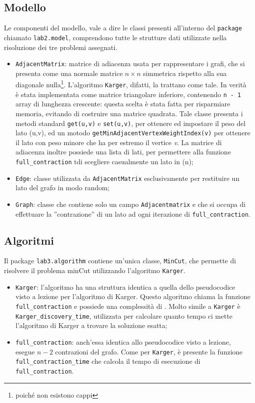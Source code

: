 \subsection{Modello}
Le componenti del modello, vale a dire le classi presenti all'interno del \texttt{package} chiamato \texttt{lab2.model}, comprendono tutte le strutture dati utilizzate nella risoluzione dei tre problemi assegnati. 
\begin{itemize}
	\item \label{adjmat}\texttt{AdjacentMatrix}: matrice di adiacenza usata per rappresentare i grafi, che si presenta come una normale matrice $n\times n$ simmetrica rispetto alla sua diagonale nulla\footnote{poiché non esistono cappi}. L'algoritmo \texttt{Karger}, difatti, la trattano come tale. In verità è stata implementata come matrice triangolare inferiore, contenendo \texttt{n - 1} array di lunghezza crescente: questa scelta è stata fatta per risparmiare memoria, evitando di costruire una matrice quadrata. Tale classe presenta i metodi standard \texttt{get(u,v)} e \texttt{set(u,v)}, per ottenere ed impostare il peso del lato (u,v), ed un motodo \texttt{getMinAdjacentVertexWeightIndex(v)} per ottenere il lato con peso minore che ha per estremo il vertice \textit{v}. La matrice di adiacenza inoltre possiede una lista di lati, per permettere alla funzione \texttt{full\_contraction} tdi scegliere casualmente un lato in \comp(n);
	\item \texttt{Edge}: classe utilizzata da \texttt{AdjacentMatrix} esclusivamente per restituire un lato del grafo in modo random;
	\item \texttt{Graph}: classe che contiene solo un campo \texttt{Adjacentmatrix} e che si occupa di effettuare la ''contrazione'' di un lato ad ogni iterazione di \texttt{full\_contraction}.
\end{itemize} 

\subsection{Algoritmi}
Il package \texttt{lab3.algorithm} contiene un'unica classe, \texttt{MinCut}, che permette di risolvere il problema minCut utilizzando l'algoritmo \texttt{Karger}.
\begin{itemize}
	\item \texttt{Karger}: l'algoritmo ha una struttura identica a quella dello pseudocodice visto a lezione per l'algoritmo di Karger. Questo algoritmo chiama la funzione \texttt{full\_contraction} e possiede una complessità di . Molto simile a \texttt{Karger} è \texttt{Karger\_discovery\_time}, utilizzata per calcolare quanto tempo ci mette l'algoritmo di Karger a trovare la soluzione esatta;
	\item \texttt{full\_contraction}: anch'essa identica allo pseudocodice visto a lezione, esegue $n-2$ contrazioni del grafo. Come per \texttt{Karger}, è presente la funzione \texttt{full\_contraction\_time} che calcola il tempo di esecuzione di \texttt{full\_contraction}.
\end{itemize}

